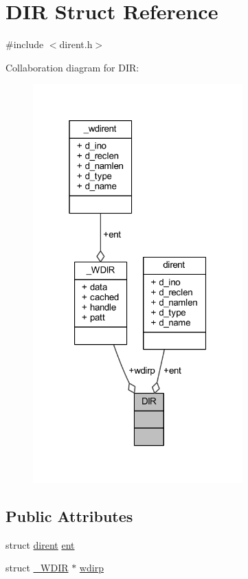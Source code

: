 \hypertarget{struct_d_i_r}{\section{D\+I\+R Struct Reference}
\label{struct_d_i_r}
}


{\ttfamily \#include $<$dirent.\+h$>$}



Collaboration diagram for D\+I\+R\+:\nopagebreak
\begin{figure}[H]
\begin{center}
\leavevmode
\includegraphics[width=229pt]{struct_d_i_r__coll__graph}
\end{center}
\end{figure}
\subsection*{Public Attributes}
\begin{DoxyCompactItemize}
\item 
struct \hyperlink{structdirent}{dirent} \hyperlink{struct_d_i_r_a59e9f5211cbb2f8e5b2807ccfdd2a7fc}{ent}
\item 
struct \hyperlink{struct___w_d_i_r}{\+\_\+\+W\+D\+I\+R} $\ast$ \hyperlink{struct_d_i_r_a29362d4a3d7f809d0f5418b26cac5d41}{wdirp}
\end{DoxyCompactItemize}


